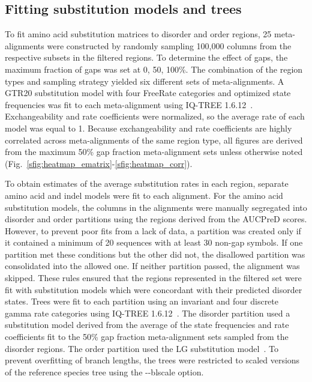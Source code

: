 \subsection{Fitting substitution models and trees}
To fit amino acid substitution matrices to disorder and order regions, 25 meta-alignments were constructed by randomly sampling 100,000 columns from the respective subsets in the filtered regions. To determine the effect of gaps, the maximum fraction of gaps was set at 0, 50, 100\%. The combination of the region types and sampling strategy yielded six different sets of meta-alignments. A GTR20 substitution model with four FreeRate categories and optimized state frequencies was fit to each meta-alignment using IQ-TREE 1.6.12~\cite{Nguyen2014}. Exchangeability and rate coefficients were normalized, so the average rate of each model was equal to 1. Because exchangeability and rate coefficients are highly correlated across meta-alignments of the same region type, all figures are derived from the maximum 50\% gap fraction meta-alignment sets unless otherwise noted (Fig.~\ref{sfig:heatmap_ematrix}-\ref{sfig:heatmap_corr}).

To obtain estimates of the average substitution rates in each region, separate amino acid and indel models were fit to each alignment. For the amino acid substitution models, the columns in the alignments were manually segregated into disorder and order partitions using the regions derived from the AUCPreD scores. However, to prevent poor fits from a lack of data, a partition was created only if it contained a minimum of 20 sequences with at least 30 non-gap symbols. If one partition met these conditions but the other did not, the disallowed partition was consolidated into the allowed one. If neither partition passed, the alignment was skipped. These rules ensured that the regions represented in the filtered set were fit with substitution models which were concordant with their predicted disorder states. Trees were fit to each partition using an invariant and four discrete gamma rate categories using IQ-TREE 1.6.12~\cite{Yang1994}. The disorder partition used a substitution model derived from the average of the state frequencies and rate coefficients fit to the 50\% gap fraction meta-alignment sets sampled from the disorder regions. The order partition used the LG substitution model~\cite{Le2008}. To prevent overfitting of branch lengths, the trees were restricted to scaled versions of the reference species tree using the -{}-blscale option.

